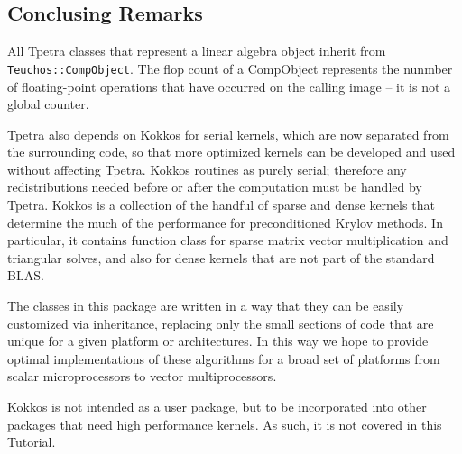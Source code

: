 \subsection{Conclusing Remarks}
\label{sec:tpetra_remarks}

All Tpetra classes that represent a linear algebra object inherit from {\tt
  Teuchos::CompObject}. The flop count of a CompObject represents the nunmber
  of floating-point operations that have occurred on the calling image -- it
  is not a global counter. 

\smallskip

Tpetra also depends on Kokkos for serial kernels, which are now
separated from the surrounding code, so that more optimized kernels can be
developed and used without affecting Tpetra. Kokkos routines as purely
serial; therefore any redistributions needed before or after the computation
must be handled by Tpetra. 
Kokkos is a collection of the handful of sparse and dense kernels that
determine the much of the performance for preconditioned Krylov methods. In
particular, it contains function class for sparse matrix vector multiplication
and triangular solves, and also for dense kernels that are not part of the
standard BLAS.

The classes in this package are written in a way that they can be easily
customized via inheritance, replacing only the small sections of code that are
unique for a given platform or architectures. In this way we hope to provide
optimal implementations of these algorithms for a broad set of platforms from
scalar microprocessors to vector multiprocessors.

Kokkos is not intended as a user package, but to be incorporated into other
packages that need high performance kernels. As such, it is not covered in
this Tutorial.
